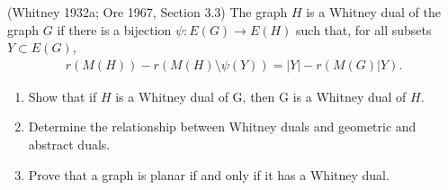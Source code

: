 \prob
{
    (Whitney 1932a; Ore 1967, Section 3.3) The graph $H$ is a Whitney dual of the graph $G$ if there is a bijection 
    $\psi : E(G) \rightarrow E(H)$ such that, for all subsets $Y \subset E(G)$,
    \begin{align}
            r(M(H)) - r(M(H)\setminus \psi(Y)) = |Y| - r(M(G)|Y).
    \end{align}
    \begin{enumerate}[label=(\roman*)]
        \item Show that if $H$ is a Whitney dual of G, then G is a Whitney dual of $H$.
        \item Determine the relationship between Whitney duals and geometric and abstract duals.
        \item Prove that a graph is planar if and only if it has a Whitney dual.
    \end{enumerate}
}
